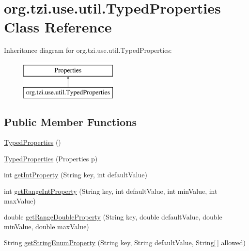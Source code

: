 \hypertarget{classorg_1_1tzi_1_1use_1_1util_1_1_typed_properties}{\section{org.\-tzi.\-use.\-util.\-Typed\-Properties Class Reference}
\label{classorg_1_1tzi_1_1use_1_1util_1_1_typed_properties}
}
Inheritance diagram for org.\-tzi.\-use.\-util.\-Typed\-Properties\-:\begin{figure}[H]
\begin{center}
\leavevmode
\includegraphics[height=2.000000cm]{classorg_1_1tzi_1_1use_1_1util_1_1_typed_properties}
\end{center}
\end{figure}
\subsection*{Public Member Functions}
\begin{DoxyCompactItemize}
\item 
\hyperlink{classorg_1_1tzi_1_1use_1_1util_1_1_typed_properties_a65bd822f114a4bdb98a916eda93acc92}{Typed\-Properties} ()
\item 
\hyperlink{classorg_1_1tzi_1_1use_1_1util_1_1_typed_properties_a620f22aedcfc739f1cc256ba5038615a}{Typed\-Properties} (Properties p)
\item 
int \hyperlink{classorg_1_1tzi_1_1use_1_1util_1_1_typed_properties_a70008dc69ce768d699c3071f72a6a0ee}{get\-Int\-Property} (String key, int default\-Value)
\item 
int \hyperlink{classorg_1_1tzi_1_1use_1_1util_1_1_typed_properties_aefaf45049eee088dd394b2e902461c55}{get\-Range\-Int\-Property} (String key, int default\-Value, int min\-Value, int max\-Value)
\item 
double \hyperlink{classorg_1_1tzi_1_1use_1_1util_1_1_typed_properties_a7d80c19e0d84d4af7e8619fa9382058e}{get\-Range\-Double\-Property} (String key, double default\-Value, double min\-Value, double max\-Value)
\item 
String \hyperlink{classorg_1_1tzi_1_1use_1_1util_1_1_typed_properties_aaaec7efeeb021853d500aecd9009f069}{get\-String\-Enum\-Property} (String key, String default\-Value, String\mbox{[}$\,$\mbox{]} allowed)
\end{DoxyCompactItemize}


